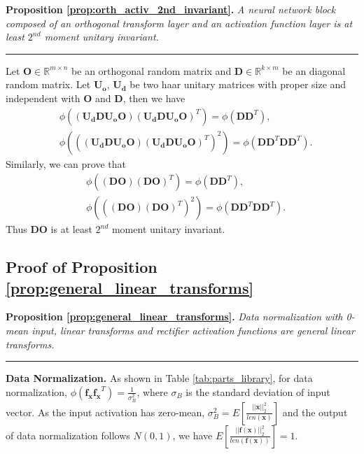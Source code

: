 \documentclass[10pt,journal,compsoc]{IEEEtran}
\begin{document}
\textbf{Proposition \ref{prop:orth_activ_2nd_invariant}. } \textit{A neural network block composed of an orthogonal transform layer and an activation function layer is at least $2^{nd}$ moment unitary invariant.}

\rule[0pt]{0.46\textwidth}{0.05em}

Let $\mathbf{O}\in \mathbb{R}^{m\times n}$ be an orthogonal random matrix and $\mathbf{D}\in \mathbb{R}^{k\times m}$ be an diagonal random matrix. Let $\mathbf{U_o}$, $\mathbf{U_d}$ be two haar unitary matrices with proper size and independent with $\mathbf{O}$ and $\mathbf{D}$, then we have
\begin{equation}
\begin{split}
    &\phi\left(\left(\mathbf{U_dDU_oO}\right)\left(\mathbf{U_dDU_oO}\right)^T\right) = \phi(\mathbf{DD}^T),\\
    &\phi\left(\left(\left(\mathbf{U_dDU_oO}\right)\left(\mathbf{U_dDU_oO}\right)^T\right)^2\right) = \phi(\mathbf{DD}^T\mathbf{DD}^T).
\end{split}
\end{equation}
Similarly, we can prove that
\begin{equation}
\begin{split}
    &\phi\left(\left(\mathbf{DO}\right)\left(\mathbf{DO}\right)^T\right) = \phi(\mathbf{DD}^T),\\
    &\phi\left(\left(\left(\mathbf{DO}\right)\left(\mathbf{DO}\right)^T\right)^2\right) = \phi(\mathbf{DD}^T\mathbf{DD}^T).
\end{split}
\end{equation}
Thus $\mathbf{DO}$ is at least $2^{nd}$ moment unitary invariant.
 
\subsection{Proof of Proposition \ref{prop:general_linear_transforms}}\label{proof:general_linear_transforms}
\textbf{Proposition \ref{prop:general_linear_transforms}. } \textit{
    Data normalization with 0-mean input, linear transforms and rectifier activation functions are general linear transforms.
}

\rule[0pt]{0.46\textwidth}{0.05em}

\textbf{Data Normalization. } As shown in Table \ref{tab:parts_library}, for data normalization, $\phi(\mathbf{f_x}\mathbf{f_x}^T)=\frac{1}{\sigma_B^2}$, where $\sigma_B$ is the standard deviation of input vector. As the input activation has zero-mean, $\sigma_B^2 = E\left[\frac{||\mathbf{x}||_2^2}{len(\mathbf{x})}\right]$ and the output of data normalization follows $N(0, 1)$, we have $E\left[\frac{||\mathbf{f}(\mathbf{x})||_2^2}{len(\mathbf{f}(\mathbf{x}))}\right]=1$.
\end{document}
